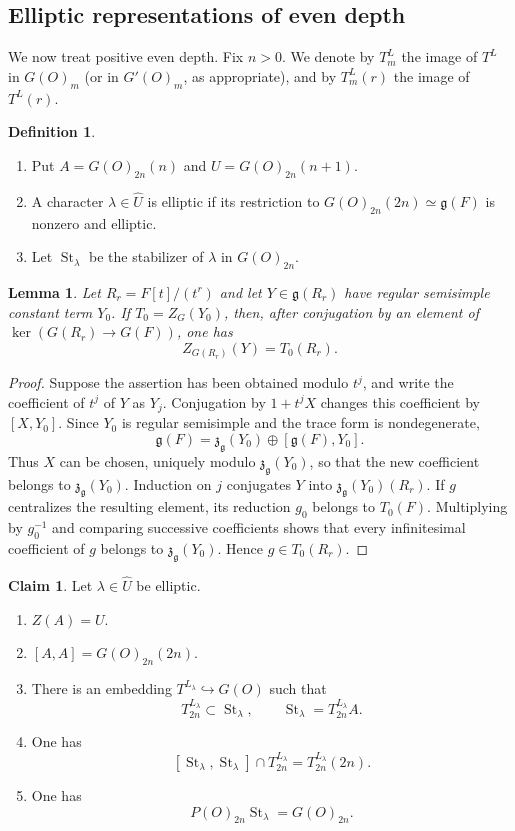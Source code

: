 \documentclass[11pt,a4paper,twoside]{amsart}
\newtheorem{lemma}[theorem]{Lemma}
\theoremstyle{definition}
\newtheorem{definition}[theorem]{Definition}
\newtheorem{claim}[theorem]{Claim}
\theoremstyle{remark}
\newcommand{\ho}{\hookrightarrow}
\newcommand{\bl}{\lambda}
\newcommand{\fg}{\mathfrak g}
\newcommand{\St}{\operatorname{St}}
\begin{document}
\subsection{Elliptic representations of even depth}\label{GO-even-depth}
We now treat positive even depth. Fix $n>0$. We denote by $T^L_m$ the image of $T^L$ in $G(O)_m$
(or in $G'(O)_m$, as appropriate), and by $T^L_m(r)$
the image of $T^L(r)$.
\begin{definition}\label{even-depth-data}
\begin{enumerate}
\item Put $A=G(O)_{2n}(n)$ and $U=G(O)_{2n}(n+1)$.
\item A character $\bl\in\widehat U$ is elliptic if its restriction to $G(O)_{2n}(2n)\simeq\fg(F)$ is nonzero and elliptic.
\item Let $\St_\bl$ be the stabilizer of $\bl$ in $G(O)_{2n}$.
\end{enumerate}
\end{definition}
\begin{lemma}\label{centralizer-lifting-even}
Let $R_r=F[t]/(t^r)$ and let $Y\in\fg(R_r)$ have regular semisimple constant term $Y_0$. If $T_0=Z_G(Y_0)$, then, after conjugation by an element of $\ker(G(R_r)\to G(F))$, one has
$$
Z_{G(R_r)}(Y)=T_0(R_r).
$$
\end{lemma}
\begin{proof}
Suppose the assertion has been obtained modulo $t^j$, and write the coefficient of $t^j$ of $Y$ as $Y_j$. Conjugation by $1+t^jX$ changes this coefficient by $[X,Y_0]$. Since $Y_0$ is regular semisimple and the trace form is nondegenerate,
$$
\fg(F)=\mathfrak z_\fg(Y_0)\oplus[\fg(F),Y_0].
$$
Thus $X$ can be chosen, uniquely modulo $\mathfrak z_\fg(Y_0)$, so that the new coefficient belongs to $\mathfrak z_\fg(Y_0)$. Induction on $j$ conjugates $Y$ into $\mathfrak z_\fg(Y_0)(R_r)$. If $g$ centralizes the resulting element, its reduction $g_0$ belongs to $T_0(F)$. Multiplying by $g_0^{-1}$ and comparing successive coefficients shows that every infinitesimal coefficient of $g$ belongs to $\mathfrak z_\fg(Y_0)$. Hence $g\in T_0(R_r)$.
\end{proof}
\begin{claim}\label{q}
Let $\bl\in\widehat U$ be elliptic.
\begin{enumerate}
\item $Z(A)=U$.
\item $[A,A]=G(O)_{2n}(2n)$.
\item There is an embedding $T^{L_\bl}\ho G(O)$ such that
$$
T^{L_\bl}_{2n}\subset\St_\bl,
\qquad
\St_\bl=T^{L_\bl}_{2n}A.
$$
\item One has
$$
[\St_\bl,\St_\bl]\cap T^{L_\bl}_{2n}=T^{L_\bl}_{2n}(2n).
$$
\item One has
$$
P(O)_{2n}\St_\bl=G(O)_{2n}.
$$
\end{enumerate}
\end{claim}
\end{document}
